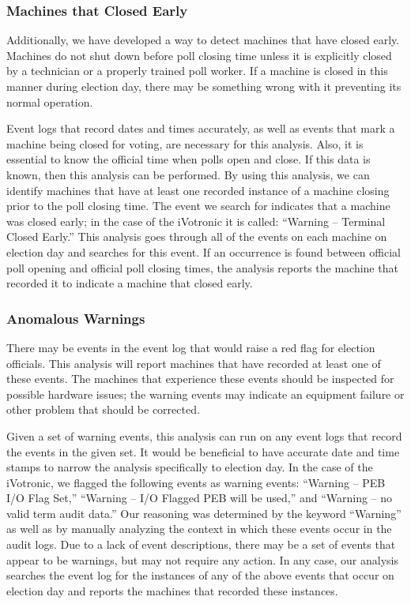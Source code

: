 \subsubsection{Machines that Closed Early}
Additionally, we have developed a way to detect machines that have closed early. Machines do not shut down before poll closing time unless it is explicitly closed by a technician or a properly trained poll worker. If a machine is closed in this manner during election day, there may be something wrong with it preventing its normal operation.
                  
Event logs that record dates and times accurately, as well as events that mark a machine being closed for voting, are necessary for this analysis. Also, it is essential to know the official time when polls open and close. If this data is known, then this analysis can be performed. By using this analysis, we can identify machines that have at least one recorded instance of a machine closing prior to the poll closing time. The event we search for indicates that a machine was closed early; in the case of the iVotronic it is called: \textquotedblleft Warning – Terminal Closed Early.\textquotedblright \hspace{2 mm} This analysis goes through all of the events on each machine on election day and searches for this event. If an occurrence is found between official poll opening and official poll closing times, the analysis reports the machine that recorded it to indicate a machine that closed early.  
        
\subsubsection{Anomalous Warnings}
There may be events in the event log that would raise a red flag for election officials. This analysis will report machines that have recorded at least one of these events. The machines that experience these events should be inspected for possible hardware issues; the warning events may indicate an equipment failure or other problem that should be corrected.

Given a set of warning events, this analysis can run on any event logs that record the events in the given set. It would be beneficial to have accurate date and time stamps to narrow the analysis specifically to election day. In the case of the iVotronic, we flagged the following events as warning events: \textquotedblleft Warning – PEB I/O Flag Set,\textquotedblright \hspace{1 mm} \textquotedblleft Warning – I/O Flagged PEB will be used,\textquotedblright \hspace{1 mm} and \textquotedblleft Warning – no valid term audit data.\textquotedblright \hspace{2 mm} Our reasoning was determined by the keyword “Warning” as well as by manually analyzing the context in which these events occur in the audit logs. Due to a lack of event descriptions, there may be a set of events that appear to be warnings, but may not require any action. In any case, our analysis searches the event log for the instances of any of the above events that occur on election day and reports the machines that recorded these instances. 

